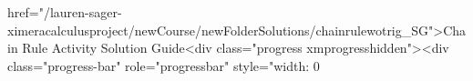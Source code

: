 href="/lauren-sager-ximeracalculusproject/newCourse/newFolderSolutions/chainrulewotrig_SG">Chain Rule Activity Solution Guide<div class="progress xmprogresshidden"><div class="progress-bar" role="progressbar" style="width: 0%